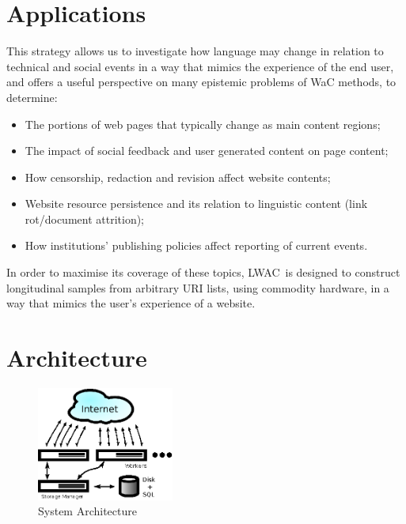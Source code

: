 \documentclass[11pt]{article}
\newcommand{\toolname}{LWAC}
\begin{document}
\section{Applications}
This strategy allows us to investigate how language may change in relation to technical and social events in a way that mimics the experience of the end user, and offers a useful perspective on many epistemic problems of WaC methods, to determine:

\begin{itemize}
    \item The portions of web pages that typically change as main content regions;
        \vspace{-4pt}
    \item The impact of social feedback and user generated content on page content;
        \vspace{-4pt}
    \item How censorship, redaction and revision affect website contents;
        \vspace{-4pt}
    \item Website resource persistence and its relation to linguistic content (link rot/document attrition);
        \vspace{-4pt}
    \item How institutions' publishing policies affect reporting of current events.
\end{itemize}

In order to maximise its coverage of these topics, \toolname~is designed to construct longitudinal samples from arbitrary URI lists, using commodity hardware, in a way that mimics the user's experience of a website.  



\section{Architecture}

\begin{figure}[h]
\centering
\includegraphics[width=0.4\textwidth]{images/arch.eps}
\caption{System Architecture}
\label{fig:arch}
\end{figure}
\end{document}
